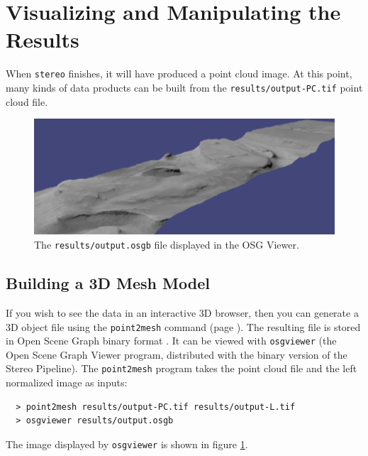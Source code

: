 \section{Visualizing and Manipulating the Results}
\label{visualising}

When \texttt{stereo} finishes, it will have produced a point cloud
image.  At this point, many kinds of data products can be built from
the \texttt{results/output-PC.tif} point cloud file.

\begin{figure}[h!]
\begin{minipage}{5in}
\includegraphics[width=5in]{images/p19-osg_400px.png}
\end{minipage}
\hfill
\begin{minipage}{1.7in}
\caption[P19 in OSG]{
    \label{p19-osg}
	The \texttt{results/output.osgb} file displayed in the OSG
        Viewer.}
\end{minipage}
\end{figure}

\subsection{Building a 3D Mesh Model}
If you wish to see the data in an interactive 3D browser, then you can
generate a 3D object file using the \texttt{point2mesh} command (page
\pageref{point2mesh}). The resulting file is stored in Open Scene
Graph binary format \cite{OSG_website}.  It can be viewed with
\texttt{osgviewer} (the Open Scene Graph Viewer program, distributed
with the binary version of the Stereo Pipeline).  The
\texttt{point2mesh} program takes the point cloud file and the left
normalized image as inputs:

\begin{verbatim}
  > point2mesh results/output-PC.tif results/output-L.tif
  > osgviewer results/output.osgb
\end{verbatim}

The image displayed by \texttt{osgviewer} is shown in figure \ref{p19-osg}.

